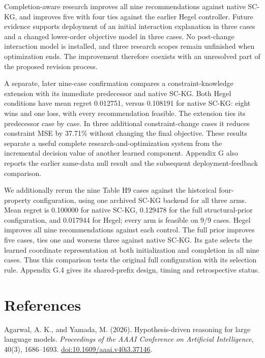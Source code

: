 \documentclass[twoside,11pt]{article}
\begin{document}
Completion-aware research improves all nine recommendations against native
SC-KG, and improves five with four ties against the earlier Hegel controller.
Future evidence supports deployment of an initial interaction explanation in
three cases and a changed lower-order objective model in three cases. No
post-change interaction model is installed, and three research scopes remain
unfinished when optimization ends. The improvement therefore coexists with an
unresolved part of the proposed revision process.


A separate, later nine-case confirmation compares a constraint-knowledge
extension with its immediate predecessor and native SC-KG. Both Hegel conditions
have mean regret 0.012751, versus 0.108191 for native SC-KG: eight wins and one
loss, with every recommendation feasible. The extension ties its predecessor
case by case. In three additional constraint-change cases it reduces constraint
MSE by 37.71\% without changing the final objective. These results separate a
useful complete research-and-optimization system from the incremental decision
value of another learned component. Appendix G also reports the earlier
same-data null result and the subsequent deployment-feedback comparison.


We additionally rerun the nine Table H9 cases against the historical four-property
configuration, using one archived SC-KG backend for all three arms. Mean regret
is 0.100000 for native SC-KG, 0.129478 for the full structural-prior configuration,
and 0.017944 for Hegel; every arm is feasible on 9/9 cases. Hegel improves all nine
recommendations against each control. The full prior improves five cases, ties
one and worsens three against native SC-KG. Its gate selects the learned
coordinate representation at both initialization and completion in all nine
cases. Thus this comparison tests the original full configuration with its
selection rule. Appendix G.4 gives its shared-prefix design, timing and
retrospective status.


\clearpage

\section*{References}

\begingroup\small\raggedright

Agarwal, A. K., and Yamada, M. (2026). Hypothesis-driven reasoning for large language models. \emph{Proceedings of the AAAI Conference on Artificial Intelligence}, 40(3), 1686–1693. \href{https://doi.org/10.1609/aaai.v40i3.37146}{doi:10.1609/aaai.v40i3.37146}.
\end{document}
